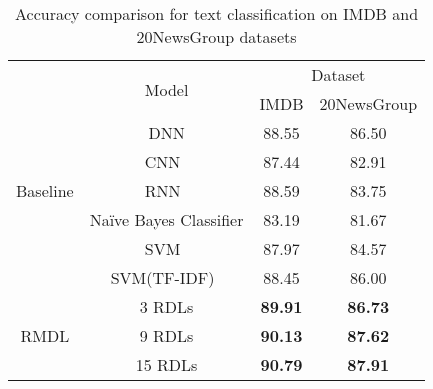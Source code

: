 \documentclass[sigconf, final]{acmart}
\begin{document}
\begin{table}[b]
\centering
\vspace{-0.25in}
\caption{Accuracy comparison for text classification on IMDB and 20NewsGroup datasets }
\vspace{-0.15in}
\label{ta:text2}
\begin{tabular}{|c|c|l|clcl|}
\hline
\multirow{2}{*}{}     & \multicolumn{2}{c|}{\multirow{2}{*}{Model}}                 & \multicolumn{4}{c|}{Dataset}                                \\ \cline{4-7} 
                      & \multicolumn{2}{c|}{}                    & \multicolumn{2}{c}{IMDB}  & \multicolumn{2}{c|}{20NewsGroup} \\ \hline
\multirow{5}{*}{Baseline}             & \multicolumn{2}{c|}{DNN}                                    & \multicolumn{2}{c}{88.55} & \multicolumn{2}{c|}{86.50}            \\ \cline{2-7} 
                      & \multicolumn{2}{c|}{CNN~\cite{yang2016hierarchical}}          & \multicolumn{2}{c}{87.44} & \multicolumn{2}{c|}{82.91}            \\ \cline{2-7} 
                      & \multicolumn{2}{c|}{RNN~\cite{yang2016hierarchical} }         & \multicolumn{2}{c}{88.59} & \multicolumn{2}{c|}{83.75}            \\ \cline{2-7} 
                      & \multicolumn{2}{c|}{Na\"{i}ve Bayes Classifier}                                    & \multicolumn{2}{c}{83.19}      & \multicolumn{2}{c|}{81.67}            \\ \cline{2-7} 
                      & \multicolumn{2}{c|}{SVM~\cite{zhang2008text}  }               & \multicolumn{2}{c}{87.97}      & \multicolumn{2}{c|}{84.57}            \\ \cline{2-7} 
                      & \multicolumn{2}{c|}{SVM(TF-IDF)~\cite{chen2016turning}} & \multicolumn{2}{c}{88.45}      & \multicolumn{2}{c|}{86.00}            \\ \hline
\multirow{3}{*}{RMDL} & \multicolumn{2}{c|}{3 RDLs}                        & \multicolumn{2}{c}{\textbf{89.91}} & \multicolumn{2}{c|}{\textbf{86.73}}            \\ \cline{2-7} 
                      & \multicolumn{2}{c|}{9 RDLs}                        & \multicolumn{2}{c}{\textbf{90.13}} & \multicolumn{2}{c|}{\textbf{87.62}}            \\ \cline{2-7} 
                      & \multicolumn{2}{c|}{15 RDLs}                       & \multicolumn{2}{c}{\textbf{90.79}} & \multicolumn{2}{c|}{\textbf{87.91}}            \\ \hline
\end{tabular}

\end{table}
\end{document}
